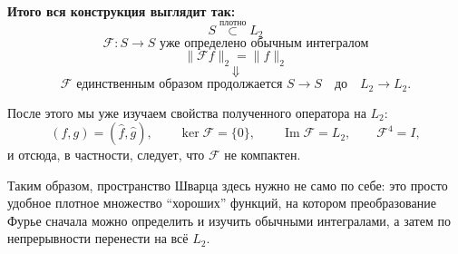 \begin{idea}
	\medskip
	
	\textbf{Итого вся конструкция выглядит так:}
	\[
	\boxed{
		S
		\overset{\text{плотно}}{\subset}
		L_2
	}
	\]
	\[
	\boxed{
		\mathcal F:S\to S
		\text{ уже определено обычным интегралом}
	}
	\]
	\[
	\boxed{
		\|\mathcal Ff\|_2=\|f\|_2
	}
	\]
	\[
	\Downarrow
	\]
	\[
	\boxed{
		\mathcal F
		\text{ единственным образом продолжается }
		S\to S
		\quad\text{до}\quad
		L_2\to L_2.
	}
	\]
	
	После этого мы уже изучаем свойства полученного оператора на \(L_2\):
	\[
	(f,g)=(\widehat f,\widehat g),
	\qquad
	\ker\mathcal F=\{0\},
	\qquad
	\operatorname{Im}\mathcal F=L_2,
	\qquad
	\mathcal F^4=I,
	\]
	и отсюда, в частности, следует, что \(\mathcal F\) не компактен.
	
	Таким образом, пространство Шварца здесь нужно не само по себе:
	это просто удобное плотное множество ``хороших'' функций,
	на котором преобразование Фурье сначала можно определить
	и изучить обычными интегралами, а затем по непрерывности
	перенести на всё \(L_2\).
\end{idea}